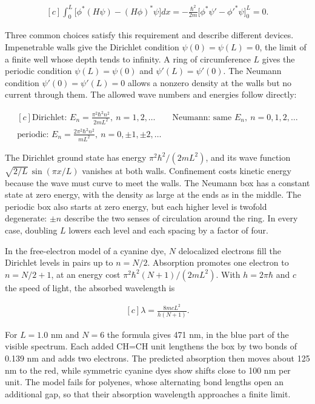 \documentclass[11pt,oneside]{book}
\newenvironment{centeredalign}{\[\begin{gathered}[c]}{\end{gathered}\]}
\begin{document}
\begin{centeredalign}
\int_0^L\big[\phi^*(H\psi)-(H\phi)^*\psi\big]dx
=-\frac{\hbar^2}{2m}\Big[\phi^*\psi'-\phi'^*\psi\Big]_0^L=0.
\end{centeredalign}

Three common choices satisfy this requirement and describe different devices. Impenetrable walls give the Dirichlet condition \(\psi(0)=\psi(L)=0\), the limit of a finite well whose depth tends to infinity. A ring of circumference \(L\) gives the periodic condition \(\psi(L)=\psi(0)\) and \(\psi'(L)=\psi'(0)\). The Neumann condition \(\psi'(0)=\psi'(L)=0\) allows a nonzero density at the walls but no current through them. The allowed wave numbers and energies follow directly:

\begin{centeredalign}
\text{Dirichlet: }E_n=\frac{\pi^2\hbar^2n^2}{2mL^2},\ n=1,2,\dots\qquad
\text{Neumann: same }E_n,\ n=0,1,2,\dots\\
\text{periodic: }E_n=\frac{2\pi^2\hbar^2n^2}{mL^2},\ n=0,\pm1,\pm2,\dots
\end{centeredalign}

The Dirichlet ground state has energy \(\pi^2\hbar^2/(2mL^2)\), and its wave function \(\sqrt{2/L}\,\sin(\pi x/L)\) vanishes at both walls. Confinement costs kinetic energy because the wave must curve to meet the walls. The Neumann box has a constant state at zero energy, with the density as large at the ends as in the middle. The periodic box also starts at zero energy, but each higher level is twofold degenerate: \(\pm n\) describe the two senses of circulation around the ring. In every case, doubling \(L\) lowers each level and each spacing by a factor of four.

In the free-electron model of a cyanine dye, \(N\) delocalized electrons fill the Dirichlet levels in pairs up to \(n=N/2\). Absorption promotes one electron to \(n=N/2+1\), at an energy cost \(\pi^2\hbar^2(N+1)/(2mL^2)\). With \(h=2\pi\hbar\) and \(c\) the speed of light, the absorbed wavelength is

\begin{centeredalign}
\lambda=\frac{8mcL^2}{h(N+1)}.
\end{centeredalign}

For \(L=1.0\) nm and \(N=6\) the formula gives 471 nm, in the blue part of the visible spectrum. Each added CH=CH unit lengthens the box by two bonds of 0.139 nm and adds two electrons. The predicted absorption then moves about 125 nm to the red, while symmetric cyanine dyes show shifts close to 100 nm per unit. The model fails for polyenes, whose alternating bond lengths open an additional gap, so that their absorption wavelength approaches a finite limit.
\end{document}

